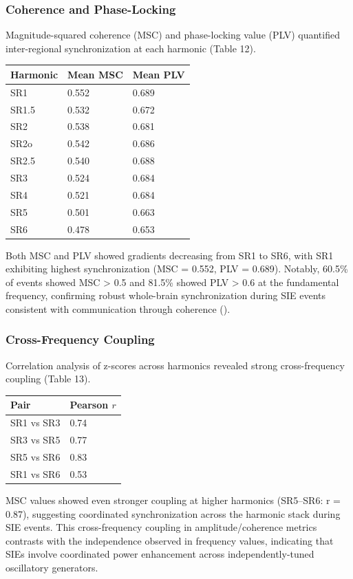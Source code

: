 \documentclass[11pt,a4paper]{article}
\begin{document}
\subsubsection{Coherence and Phase-Locking}
Magnitude-squared coherence (MSC) and phase-locking value (PLV) quantified inter-regional synchronization at each harmonic (Table 12).
\begin{table}[H]
    \centering
    \begin{tabular}{lll}
        \toprule
        Harmonic & Mean MSC & Mean PLV \\
        \midrule
        SR1 & 0.552 & 0.689 \\
        SR1.5 & 0.532 & 0.672 \\
        SR2 & 0.538 & 0.681 \\
        SR2o & 0.542 & 0.686 \\
        SR2.5 & 0.540 & 0.688 \\
        SR3 & 0.524 & 0.684 \\
        SR4 & 0.521 & 0.684 \\
        SR5 & 0.501 & 0.663 \\
        SR6 & 0.478 & 0.653 \\
        \bottomrule
    \end{tabular} \end{table}
Both MSC and PLV showed gradients decreasing from SR1 to SR6, with SR1 exhibiting highest synchronization (MSC = 0.552, PLV = 0.689). Notably, 60.5\% of events showed MSC > 0.5 and 81.5\% showed PLV > 0.6 at the fundamental frequency, confirming robust whole-brain synchronization during SIE events consistent with communication through coherence (\cite{fries2015rhythms}).

\subsubsection{Cross-Frequency Coupling}
Correlation analysis of z-scores across harmonics revealed strong cross-frequency coupling (Table 13).
\begin{table}[H]
    \centering
    \begin{tabular}{ll}
        \toprule
        Pair & Pearson $r$ \\
        \midrule
        SR1 vs SR3 & 0.74 \\
        SR3 vs SR5 & 0.77 \\
        SR5 vs SR6 & 0.83 \\
        SR1 vs SR6 & 0.53 \\
        \bottomrule
    \end{tabular} \end{table}
MSC values showed even stronger coupling at higher harmonics (SR5–SR6: r = 0.87), suggesting coordinated synchronization across the harmonic stack during SIE events. This cross-frequency coupling in amplitude/coherence metrics contrasts with the independence observed in frequency values, indicating that SIEs involve coordinated power enhancement across independently-tuned oscillatory generators.
\end{document}
